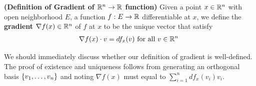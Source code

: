 \documentclass{report}
\begin{document}
\begin{definition}
\textbf{(Definition of Gradient of $\mathbb{R}^n\rightarrow \mathbb{R}$ function)} Given a point $x\in\mathbb{R}^n$ with open neighborhood $E$, a function $f:E\rightarrow \mathbb{R}$ differentiable at $x$, we define the \textbf{gradient} $\nabla f(x)\in\mathbb{R}^n$ of $f$ at $x$ to be the unique vector that satisfy
\begin{align*}
\nabla f(x)\cdot v=df_x(v)\text{ for all $v\in\mathbb{R}^n$ }
\end{align*}
\end{definition}
\begin{mdframed}
We should immediately discuss whether our definition of gradient is well-defined. The proof of existence and uniqueness follows from generating an orthogonal basis $\{ v_1,\dots ,v_n \}$ and noting $\nabla f(x)$ must equal to $\sum_{i=1}^n df_x(v_i)v_i$.\\


\end{mdframed}
\end{document}
